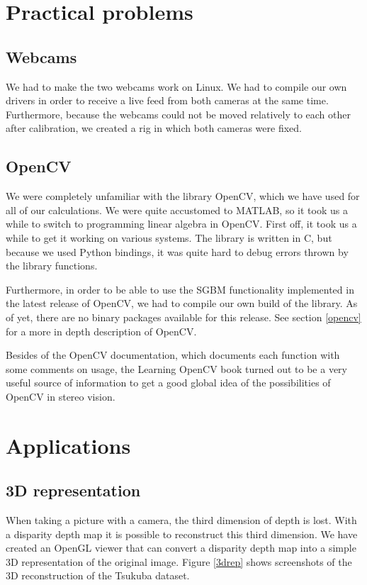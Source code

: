 \documentclass[a4paper]{article}
\begin{document}
\section{Practical problems}

\subsection{Webcams} 
We had to make the two webcams work on Linux. We had to compile our own drivers
in order to receive a live feed from both cameras at the same time.
Furthermore, because the webcams could not be moved relatively to each other
after calibration, we created a rig in which both cameras were fixed.

\subsection{OpenCV} 
We were completely unfamiliar with the library OpenCV, which we have used for
all of our calculations. We were quite accustomed to MATLAB, so it took us a
while to switch to programming linear algebra in OpenCV. First off, it took
us a while to get it working on various systems. The library is written in C,
but because we used Python bindings, it was quite hard to debug errors thrown
by the library functions.

Furthermore, in order to be able to use the SGBM functionality implemented in
the latest release of OpenCV, we had to compile our own build of the library. As
of yet, there are no binary packages available for this release. See section \ref{opencv}
for a more in depth description of OpenCV.

Besides of the OpenCV documentation, which documents each function with some comments on usage, the Learning OpenCV book \cite{LearningOpenCV} turned out to be a very useful source of information to get a good global idea of the possibilities of OpenCV in stereo vision.


\section{Applications}

\subsection{3D representation}
When taking a picture with a camera, the third dimension of depth is lost. With
a disparity depth map it is possible to reconstruct this third dimension. We
have created an OpenGL viewer that can convert a disparity depth map into a
simple 3D representation of the original image. Figure \ref{3drep}
shows screenshots of the 3D reconstruction of the Tsukuba dataset.
\end{document}
